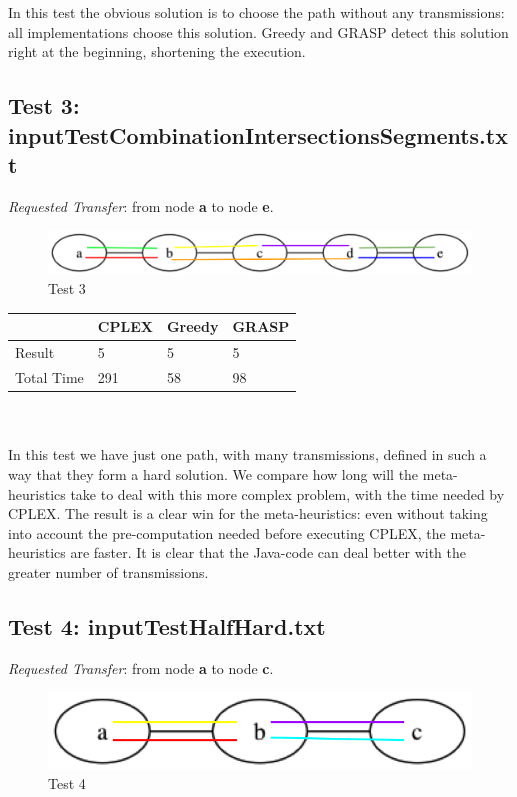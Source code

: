 \documentclass[11pt,a4paper]{article}
\begin{document}
In this test the obvious solution is to choose the path without any transmissions: all implementations choose this solution. Greedy and GRASP detect this solution right at the beginning, shortening the execution.

\subsection{Test 3: inputTestCombinationIntersectionsSegments.txt}

\textit{Requested Transfer}: from node \textbf{a} to node \textbf{e}.\\

\begin{figure}[H]
  \centering
    \includegraphics[scale=0.7]{inputTestCombinationIntersectionsSegments.png}
  \caption{Test 3}
  \label{fig:test3}
\end{figure}

\begin{tabular}{| l | l | l | l |}
\hline
 & CPLEX & Greedy & GRASP \\ \hline
Result & 5 & 5 & 5 \\ \hline
Total Time & 291 & 58 & 98 \\ \hline
\end{tabular}\\\\

In this test we have just one path, with many transmissions, defined in such a way that they form a hard solution. We compare how long will the meta-heuristics take to deal with this more complex problem, with the time needed by CPLEX. The result is a clear win for the meta-heuristics: even without taking into account the pre-computation needed before executing CPLEX, the meta-heuristics are faster. It is clear that the Java-code can deal better with the greater number of transmissions.

\subsection{Test 4: inputTestHalfHard.txt}

\textit{Requested Transfer}: from node \textbf{a} to node \textbf{c}.\\

\begin{figure}[H]
  \centering
    \includegraphics[scale=0.7]{inputTestHalfHard.png}
  \caption{Test 4}
  \label{fig:test4}
\end{figure}
\end{document}
